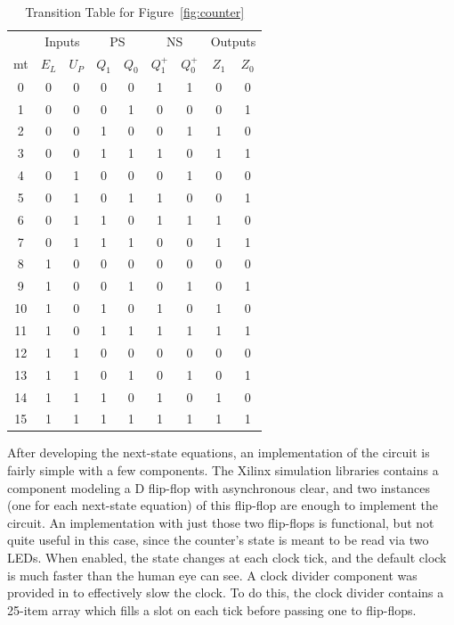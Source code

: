 \documentclass{report}
\begin{document}
\begin{table}[hbtp]
  \centering
  \begin{tabular}{c|cc|cc|cc|cc}
    & \multicolumn{2}{c|}{Inputs} & \multicolumn{2}{c|}{PS} & \multicolumn{2}{c|}{NS} & \multicolumn{2}{c}{Outputs} \\
    mt & $E_L$ & $U_P$ & $Q_1$ & $Q_0$ & $Q_1^+$ & $Q_0^+$ & $Z_1$ & $Z_0$ \\
    \hline
    0  & 0    & 0    & 0     & 0     & 1       & 1       & 0     & 0     \\
    1  & 0    & 0    & 0     & 1     & 0       & 0       & 0     & 1     \\
    2  & 0    & 0    & 1     & 0     & 0       & 1       & 1     & 0     \\
    3  & 0    & 0    & 1     & 1     & 1       & 0       & 1     & 1     \\
    4  & 0    & 1    & 0     & 0     & 0       & 1       & 0     & 0     \\
    5  & 0    & 1    & 0     & 1     & 1       & 0       & 0     & 1     \\
    6  & 0    & 1    & 1     & 0     & 1       & 1       & 1     & 0     \\
    7  & 0    & 1    & 1     & 1     & 0       & 0       & 1     & 1     \\
    8  & 1    & 0    & 0     & 0     & 0       & 0       & 0     & 0     \\
    9  & 1    & 0    & 0     & 1     & 0       & 1       & 0     & 1     \\
    10 & 1    & 0    & 1     & 0     & 1       & 0       & 1     & 0     \\
    11 & 1    & 0    & 1     & 1     & 1       & 1       & 1     & 1     \\
    12 & 1    & 1    & 0     & 0     & 0       & 0       & 0     & 0     \\
    13 & 1    & 1    & 0     & 1     & 0       & 1       & 0     & 1     \\
    14 & 1    & 1    & 1     & 0     & 1       & 0       & 1     & 0     \\
    15 & 1    & 1    & 1     & 1     & 1       & 1       & 1     & 1     \\
  \end{tabular}
  \caption{\label{tab:trans} Transition Table for Figure~\ref{fig:counter}}
\end{table}

After developing the next-state equations, an implementation of the circuit is fairly simple with a few components.  The Xilinx simulation libraries contains a component modeling a D flip-flop with asynchronous clear, and two instances (one for each next-state equation) of this flip-flop are enough to implement the circuit.  An implementation with just those two flip-flops is functional, but not quite useful in this case, since the counter's state is meant to be read via two LEDs.  When enabled, the state changes at each clock tick, and the default clock is much faster than the human eye can see.  A clock divider component was provided in to effectively slow the clock.  To do this, the clock divider contains a 25-item array which fills a slot on each tick before passing one to flip-flops.
\end{document}
